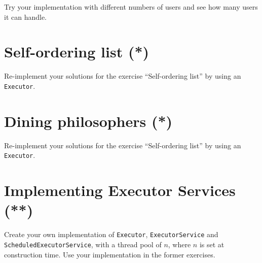 \documentclass{article}
\begin{document}
Try your implementation with different numbers of users and see how
many users it can handle. 

%




\section{Self-ordering list (*)}
\label{sec:self-ordering-list--}

Re-implement your solutions for the exercise ``Self-ordering list'' by
using an \verb+Executor+. 

\section{Dining philosophers (*)}
\label{sec:dining-philosophers}

Re-implement your solutions for the exercise ``Self-ordering list'' by
using an \verb+Executor+. 

\section{Implementing Executor Services (**)}
\label{sec:impl-exec-}

Create your own implementation of \verb+Executor+,
\verb+ExecutorService+ and 
\verb+ScheduledExecutorService+, with a thread pool of $n$, 
where $n$ is set at construction time. Use your implementation in the
former exercises. 
\end{document}
